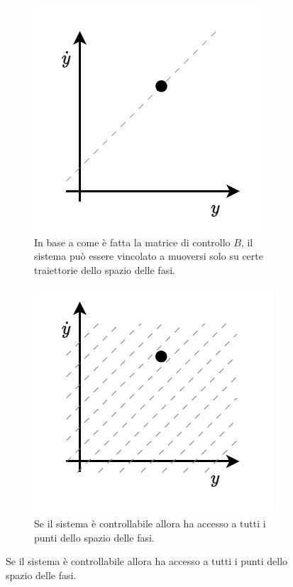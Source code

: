 \begin{example}
\begin{figure}[H]
\begin{subfigure}[t]{0.30\textwidth}
            \includegraphics[width=\textwidth]{assets/ex-pianocartesiano-uncontrollable}
            \caption{In base a come è fatta la matrice di controllo $B$, il sistema può
            essere vincolato a muoversi solo su certe traiettorie dello spazio delle fasi.}
            \label{fig:ex-uncontrollable}
        \end{subfigure}
        \hfill
        \begin{subfigure}[t]{0.30\textwidth}
                  \centering
                  \includegraphics[width=\textwidth]{assets/ex-pianocartesiano-controllable}
                  \caption{Se il sistema è controllabile allora ha accesso a
                  tutti i punti dello spazio delle fasi.}
            \label{fig:ex-controllable}
        \end{subfigure}


\end{figure}
\end{example}
